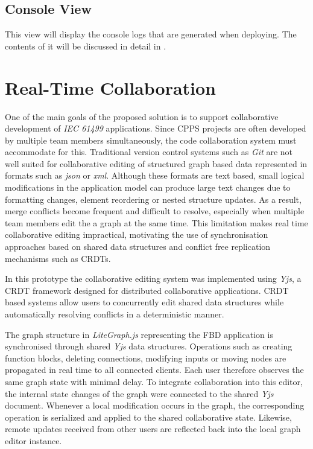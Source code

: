 
\subsection{Console View}
This view will display the console logs that are generated when deploying. The contents of it will be discussed in detail in .


\section{Real-Time Collaboration} \label{sec:real-time-collaboration}
One of the main goals of the proposed solution is to support collaborative development of \textit{IEC 61499} applications. Since \ac{CPPS} projects are often developed by multiple team members simultaneously, the code collaboration system must accommodate for this. Traditional version control systems such as \textit{Git} are not well suited for collaborative editing of structured graph based data represented in formats such as \textit{json} or \textit{xml}. Although these formats are text based, small logical modifications in the application model can produce large text changes due to formatting changes, element reordering or nested structure updates. As a result, merge conflicts become frequent and difficult to resolve, especially when multiple team members edit the a graph at the same time. This limitation makes real time collaborative editing impractical, motivating the use of synchronisation approaches based on shared data structures and conflict free replication mechanisms such as \acp{CRDT}.

In this prototype the collaborative editing system was implemented using \textit{Yjs}, a \ac{CRDT} framework designed for distributed collaborative applications. \ac{CRDT} based systems allow users to concurrently edit shared data structures while automatically resolving conflicts in a deterministic manner.


The graph structure in \textit{LiteGraph.js} representing the \ac{FBD} application is synchronised through shared \textit{Yjs} data structures. Operations such as creating function blocks, deleting connections, modifying inputs or moving nodes are propagated in real time to all connected clients. Each user therefore observes the same graph state with minimal delay. To integrate collaboration into this editor, the internal state changes of the graph were connected to the shared \textit{Yjs} document. Whenever a local modification occurs in the graph, the corresponding operation is serialized and applied to the shared collaborative state. Likewise, remote updates received from other users are reflected back into the local graph editor instance.


